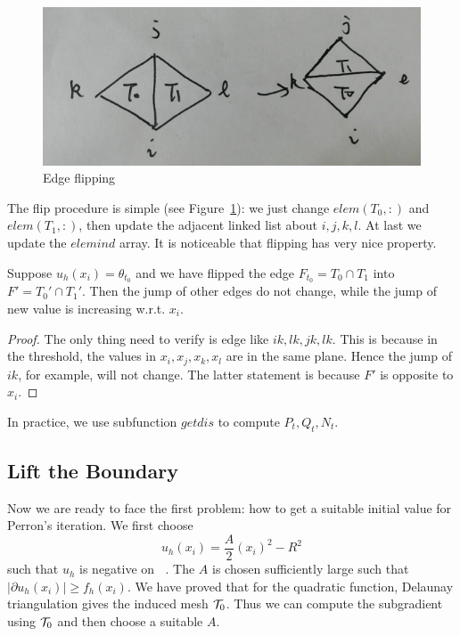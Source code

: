 \documentclass{article}
\DeclareMathOperator{\nhp}{\mathcal N_h^{\partial}}
\begin{document}
\begin{figure}[H]
	
	
	\centering
	\includegraphics[scale=0.3]{../fig/flip.png}
	\caption{Edge flipping}
	\label{fig:flip}
\end{figure}
The flip procedure is simple (see Figure~\ref{fig:flip}): we just change $elem(T_0,:)$ and $elem(T_1,:)$, then update the adjacent linked list about $i,j,k,l$. At last we update the $elemind$ array. It is noticeable that flipping has very nice property.

\begin{proposition}
	Suppose $u_h(x_i) = \theta_{t_0}$ and we have flipped the edge $F_{t_0} = T_0 \cap T_1$ into $F' = T_0' \cap T_1'$. Then the jump of other edges do not change, while the jump of new value is increasing w.r.t. $x_i$.
\end{proposition}
\begin{proof}
	The only thing need to verify is edge like $ik,lk,jk,lk$. This is because in the threshold, the values in $x_i, x_j, x_k, x_l$ are in the same plane. Hence the jump of $ik$, for example, will not change. The latter statement is because $F'$ is opposite to $x_i$.
\end{proof}

In practice, we use subfunction $getdis$ to compute $P_t, Q_t, N_t$. 

\subsection{Lift the Boundary}
Now we are ready to face the first problem: how to get a suitable initial value for Perron's iteration. We first choose 
$$u_h(x_i) = \frac{A}{2}(x_i)^2 - R^2$$
such that $u_h$ is negative on $\nhp$. The $A$ is chosen sufficiently large such that $|\partial u_h(x_i)| \ge f_h(x_i)$. We have proved that for the quadratic function, Delaunay triangulation gives the induced mesh $\mathcal T_0$. Thus we can compute the subgradient using $\mathcal T_0$ and then choose a suitable $A$. 
\end{document}
